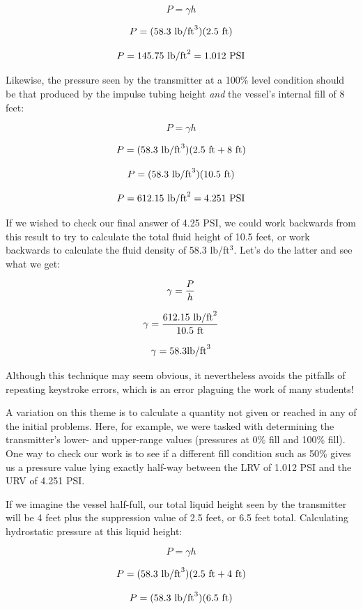 $$P = \gamma h$$

$$P = (58.3 \hbox{ lb/ft}^3)(2.5 \hbox{ ft})$$

$$P = 145.75 \hbox{ lb/ft}^2 = 1.012 \hbox{ PSI}$$

\filbreak

Likewise, the pressure seen by the transmitter at a 100\% level condition should be that produced by the impulse tubing height \textit{and} the vessel's internal fill of 8 feet:

$$P = \gamma h$$

$$P = (58.3 \hbox{ lb/ft}^3)(2.5 \hbox{ ft} + 8 \hbox{ ft})$$

$$P = (58.3 \hbox{ lb/ft}^3)(10.5 \hbox{ ft})$$

$$P = 612.15 \hbox{ lb/ft}^2 = 4.251 \hbox{ PSI}$$

If we wished to check our final answer of 4.25 PSI, we could work backwards from this result to try to calculate the total fluid height of 10.5 feet, or work backwards to calculate the fluid density of 58.3 lb/ft$^{3}$.  Let's do the latter and see what we get:

$$\gamma = {P \over h}$$

$$\gamma = {612.15 \hbox{ lb/ft}^2 \over 10.5 \hbox{ ft}}$$

$$\gamma = 58.3 \hbox{lb/ft}^3$$

Although this technique may seem obvious, it nevertheless avoids the pitfalls of repeating keystroke errors, which is an error plaguing the work of many students!

\vskip 10pt

\filbreak

A variation on this theme is to calculate a quantity not given or reached in any of the initial problems.  Here, for example, we were tasked with determining the transmitter's lower- and upper-range values (pressures at 0\% fill and 100\% fill).  One way to check our work is to see if a different fill condition such as 50\% gives us a pressure value lying exactly half-way between the LRV of 1.012 PSI and the URV of 4.251 PSI.

If we imagine the vessel half-full, our total liquid height seen by the transmitter will be 4 feet plus the suppression value of 2.5 feet, or 6.5 feet total.  Calculating hydrostatic pressure at this liquid height:

$$P = \gamma h$$

$$P = (58.3 \hbox{ lb/ft}^3)(2.5 \hbox{ ft} + 4 \hbox{ ft})$$

$$P = (58.3 \hbox{ lb/ft}^3)(6.5 \hbox{ ft})$$


